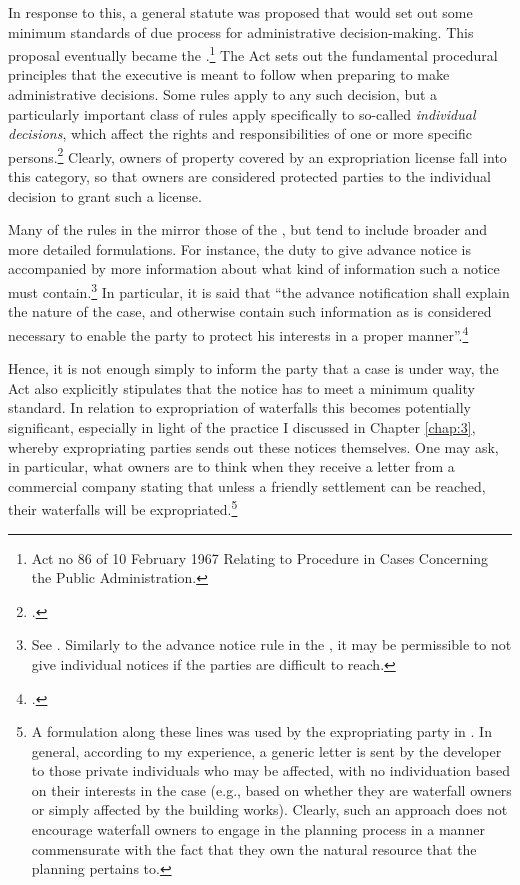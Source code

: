 In response to this, a general statute was proposed that would set out some minimum standards of due process for administrative decision-making. This proposal eventually became the \cite{paa67}.\footnote{Act no 86 of 10 February 1967 Relating to Procedure in Cases Concerning the Public Administration.} The Act sets out the fundamental procedural principles that the executive is meant to follow when preparing to make administrative decisions. Some rules apply to any such decision, but a particularly important class of rules apply specifically to so-called {\it individual decisions}, which affect the rights and responsibilities of one or more specific persons.\footcite[2]{paa67} Clearly, owners of property covered by an expropriation license fall into this category, so that owners are considered protected parties to the individual decision to grant such a license.

Many of the rules in the \cite{paa67} mirror those of the \cite{ea59}, but tend to include broader and more detailed formulations. For instance, the duty to give advance notice is accompanied by more information about what kind of information such a notice must contain.\footnote{See \cite[16]{paa67}. Similarly to the advance notice rule in the \cite{ea59}, it may be permissible to not give individual notices if the parties are difficult to reach.} In particular, it is said that ``the advance notification shall explain the nature of the case, and otherwise contain such information as is considered necessary to enable the party to protect his interests in a proper manner''.\footcite[16]{paa67} 

Hence, it is not enough simply to inform the party that a case is under way, the Act also explicitly stipulates that the notice has to meet a minimum quality standard. In relation to expropriation of waterfalls this becomes potentially significant, especially in light of the practice I discussed in Chapter \ref{chap:3}, whereby expropriating parties sends out these notices themselves. One may ask, in particular, what owners are to think when they receive a letter from a commercial company stating that unless a friendly settlement can be reached, their waterfalls will be expropriated.\footnote{A formulation along these lines was used by the expropriating party in \cite{sauda09}. In general, according to my experience, a generic letter is sent by the developer to those private individuals who may be affected, with no individuation based on their interests in the case (e.g., based on whether they are waterfall owners or simply affected by the building works). Clearly, such an approach does not encourage waterfall owners to engage in the planning process in a manner commensurate with the fact that they own the natural resource that the planning pertains to.}

